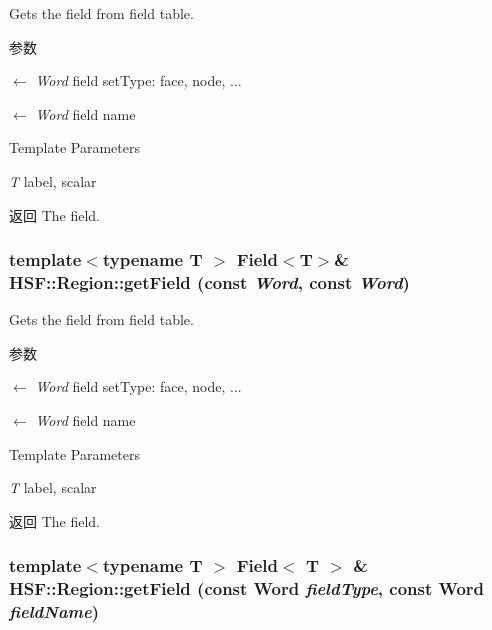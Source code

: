 Gets the field from field table. 
\begin{DoxyParams}{参数}
\item[\mbox{$\leftarrow$} {\em Word}]field setType: face, node, ... \item[\mbox{$\leftarrow$} {\em Word}]field name \end{DoxyParams}

\begin{DoxyTemplParams}{Template Parameters}
\item[{\em T}]label, scalar \end{DoxyTemplParams}
\begin{DoxyReturn}{返回}
The field. 
\end{DoxyReturn}
\hypertarget{classHSF_1_1Region_a2fc8f3916190395f4b43547755113c8e}{
\subsubsection[{getField}]{\setlength{\rightskip}{0pt plus 5cm}template$<$typename T $>$ {\bf Field}$<$T$>$\& HSF::Region::getField (const  {\em Word}, \/  const  {\em Word})}}
\label{classHSF_1_1Region_a2fc8f3916190395f4b43547755113c8e}


Gets the field from field table. 
\begin{DoxyParams}{参数}
\item[\mbox{$\leftarrow$} {\em Word}]field setType: face, node, ... \item[\mbox{$\leftarrow$} {\em Word}]field name \end{DoxyParams}

\begin{DoxyTemplParams}{Template Parameters}
\item[{\em T}]label, scalar \end{DoxyTemplParams}
\begin{DoxyReturn}{返回}
The field. 
\end{DoxyReturn}
\hypertarget{classHSF_1_1Region_ad6b6fb8af5a80adae5aa77b04a092a01}{
\subsubsection[{getField}]{\setlength{\rightskip}{0pt plus 5cm}template$<$typename T $>$ {\bf Field}$<$ T $>$ \& HSF::Region::getField (const Word {\em fieldType}, \/  const Word {\em fieldName})}}
\label{classHSF_1_1Region_ad6b6fb8af5a80adae5aa77b04a092a01}


